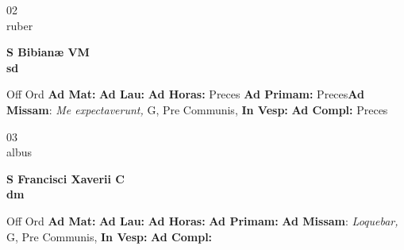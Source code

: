 \documentclass[10pt, openany]{book}
\begin{document}
    \begin{center}
        \begin{minipage}{3.5in}
            \vspace{2em}
            \begin{minipage}{0.5in}
                {\Huge 02} \\
                {\normalsize ruber}
            \end{minipage}
            \begin{minipage}{3.0in}
                \textbf{ \large S Bibianæ VM \\
                \textnormal{\normalsize sd}}

            \end{minipage}
            \begin{justify}Off Ord
                \textbf{Ad Mat: }
                \textbf{Ad Lau: }
                \textbf{Ad Horas: }Preces
                \textbf{Ad Primam: }Preces\textbf{Ad Missam}: \textit{Me expectaverunt,} G, Pre Communis, 
                \textbf{In Vesp: }
                \textbf{Ad Compl: }Preces
            \end{justify}
        \end{minipage}
    \end{center}

    \begin{center}
        \begin{minipage}{3.5in}
            \vspace{2em}
            \begin{minipage}{0.5in}
                {\Huge 03} \\
                {\normalsize albus}
            \end{minipage}
            \begin{minipage}{3.0in}
                \textbf{ \large S Francisci Xaverii C \\
                \textnormal{\normalsize dm}}

            \end{minipage}
            \begin{justify}Off Ord
                \textbf{Ad Mat: }
                \textbf{Ad Lau: }
                \textbf{Ad Horas: }
                \textbf{Ad Primam: }\textbf{Ad Missam}: \textit{Loquebar,} G, Pre Communis, 
                \textbf{In Vesp: }
                \textbf{Ad Compl: }
            \end{justify}
        \end{minipage}
    \end{center}
\end{document}
